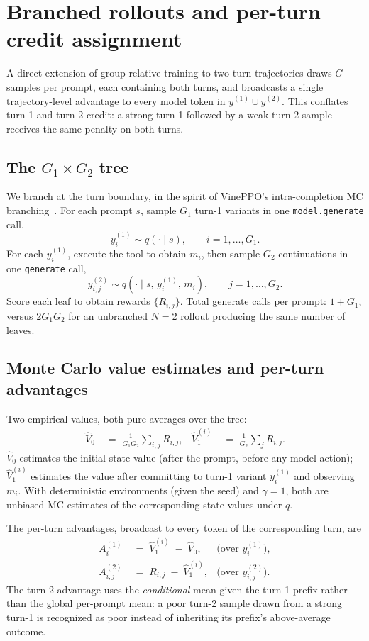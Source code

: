 \documentclass[11pt,a4paper]{article}
\begin{document}
\section{Branched rollouts and per-turn credit assignment}
\label{sec:branched}

A direct extension of group-relative training to two-turn trajectories
draws $G$ samples per prompt, each containing both turns, and broadcasts
a single trajectory-level advantage to every model token in
$y^{(1)}\cup y^{(2)}$. This conflates turn-1 and turn-2 credit: a strong
turn-1 followed by a weak turn-2 sample receives the same penalty on
both turns.

\subsection{The $G_1 \times G_2$ tree}

We branch at the turn boundary, in the spirit of VinePPO's
intra-completion MC branching~\cite{kazemnejad2024vineppo}. For each
prompt $s$, sample $G_1$ turn-1 variants in one \texttt{model.generate}
call,
\[
  y^{(1)}_i \sim q(\cdot\mid s),\qquad i=1,\dots,G_1.
\]
For each $y^{(1)}_i$, execute the tool to obtain $m_i$, then sample
$G_2$ continuations in one \texttt{generate} call,
\[
  y^{(2)}_{i,j} \sim q(\cdot\mid s,\, y^{(1)}_i,\, m_i),\qquad j=1,\dots,G_2.
\]
Score each leaf to obtain rewards $\{R_{i,j}\}$. Total generate calls
per prompt: $1+G_1$, versus $2G_1 G_2$ for an unbranched $N=2$ rollout
producing the same number of leaves.

\subsection{Monte Carlo value estimates and per-turn advantages}

Two empirical values, both pure averages over the tree:
\begin{align}
  \widehat V_0          &\;=\; \frac{1}{G_1 G_2}\sum_{i,j} R_{i,j}, &
  \widehat V_1^{(i)}    &\;=\; \frac{1}{G_2}\sum_{j} R_{i,j}.
\end{align}
$\widehat V_0$ estimates the initial-state value (after the prompt,
before any model action); $\widehat V_1^{(i)}$ estimates the value
after committing to turn-1 variant $y^{(1)}_i$ and observing $m_i$.
With deterministic environments (given the seed) and $\gamma=1$, both
are unbiased MC estimates of the corresponding state values under $q$.

The per-turn advantages, broadcast to every token of the corresponding
turn, are
\begin{align}
  A^{(1)}_{i}      &\;=\; \widehat V_1^{(i)} \;-\; \widehat V_0,
  &\text{(over $y^{(1)}_i$)}, \label{eq:adv1}\\
  A^{(2)}_{i,j}    &\;=\; R_{i,j} \;-\; \widehat V_1^{(i)},
  &\text{(over $y^{(2)}_{i,j}$).} \label{eq:adv2}
\end{align}
The turn-2 advantage uses the \emph{conditional} mean given the turn-1
prefix rather than the global per-prompt mean: a poor turn-2 sample
drawn from a strong turn-1 is recognized as poor instead of inheriting
its prefix's above-average outcome.
\end{document}
